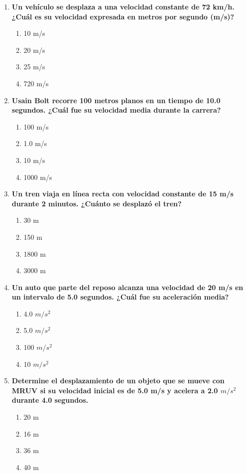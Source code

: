 \documentclass[12pt]{article}
\begin{document}
\begin{enumerate}[label=\arabic*.]
    \item \textbf{Un vehículo se desplaza a una velocidad constante de 72 km/h. ¿Cuál es su velocidad expresada en metros por segundo (m/s)?}
    \begin{enumerate}[label=\alph*)]
        \item 10 m/s
        \item 20 m/s
        \item 25 m/s
        \item 720 m/s
    \end{enumerate}

    \item \textbf{Usain Bolt recorre 100 metros planos en un tiempo de 10.0 segundos. ¿Cuál fue su velocidad media durante la carrera?}
    \begin{enumerate}[label=\alph*)]
        \item 100 m/s
        \item 1.0 m/s
        \item 10 m/s
        \item 1000 m/s
    \end{enumerate}

    \item \textbf{Un tren viaja en línea recta con velocidad constante de 15 m/s durante 2 minutos. ¿Cuánto se desplazó el tren?}
    \begin{enumerate}[label=\alph*)]
        \item 30 m
        \item 150 m
        \item 1800 m
        \item 3000 m
    \end{enumerate}

    \item \textbf{Un auto que parte del reposo alcanza una velocidad de 20 m/s en un intervalo de 5.0 segundos. ¿Cuál fue su aceleración media?}
    \begin{enumerate}[label=\alph*)]
        \item 4.0 $m/s^2$
        \item 5.0 $m/s^2$
        \item 100 $m/s^2$
        \item 10 $m/s^2$
    \end{enumerate}

    \item \textbf{Determine el desplazamiento de un objeto que se mueve con MRUV si su velocidad inicial es de 5.0 m/s y acelera a 2.0 $m/s^2$ durante 4.0 segundos.}
    \begin{enumerate}[label=\alph*)]
        \item 20 m
        \item 16 m
        \item 36 m
        \item 40 m
    \end{enumerate}


\end{enumerate}
\end{document}
